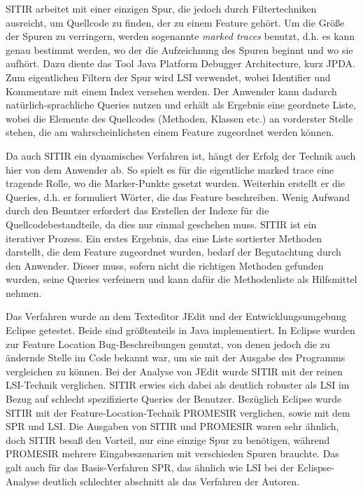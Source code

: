 \documentclass[runningheads,a4paper]{llncs}
\begin{document}
\ac{SITIR} arbeitet mit einer einzigen Spur, die jedoch durch Filtertechniken ausreicht, um Quellcode zu finden, der zu einem Feature gehört. Um die Größe der Spuren zu verringern, werden sogenannte \textit{marked traces} benutzt, d.h. es kann genau bestimmt werden, wo der die Aufzeichnung des Spuren beginnt und wo sie aufhört. Dazu diente das Tool Java Platform Debugger Architecture, kurz JPDA. Zum eigentlichen Filtern der Spur wird \ac{LSI} verwendet, wobei Identifier und Kommentare mit einem Index versehen werden. Der Anwender kann dadurch natürlich-sprachliche Queries nutzen und erhält als Ergebnis eine geordnete Liste, wobei die Elemente des Quellcodes (Methoden, Klassen etc.) an vorderster Stelle stehen, die am wahrscheinlichsten einem Feature zugeordnet werden können.

Da auch \ac{SITIR} ein dynamisches Verfahren ist, hängt der Erfolg der Technik auch hier von dem Anwender ab. So spielt es für die eigentliche marked trace eine tragende Rolle, wo die Marker-Punkte gesetzt wurden. Weiterhin erstellt er die Queries, d.h. er formuliert Wörter, die das Feature beschreiben. Wenig Aufwand durch den Benutzer erfordert das Erstellen der Indexe für die Quellcodebestandteile, da dies nur einmal geschehen muss. \ac{SITIR} ist ein iterativer Prozess. Ein erstes Ergebnis, das eine Liste sortierter Methoden darstellt, die dem Feature zugeordnet wurden, bedarf der Begutachtung durch den Anwender. Dieser muss, sofern nicht die richtigen Methoden gefunden wurden, seine Queries verfeinern und kann dafür die Methodenliste als Hilfsmittel nehmen.

Das Verfahren wurde an dem Texteditor JEdit und der Entwicklungsumgebung Eclipse getestet. Beide sind größtenteils in Java implementiert. In Eclipse wurden zur Feature Location Bug-Beschreibungen genutzt, von denen jedoch die zu ändernde Stelle im Code bekannt war, um sie mit der Ausgabe des Programms vergleichen zu können. Bei der Analyse von JEdit wurde \ac{SITIR} mit der reinen \ac{LSI}-Technik verglichen. \ac{SITIR} erwies sich dabei als deutlich robuster als \ac{LSI} im Bezug auf schlecht spezifizierte Queries der Benutzer. Bezüglich Eclipse wurde \ac{SITIR} mit der Feature-Location-Technik PROMESIR verglichen, sowie mit dem \ac{SPR} und \ac{LSI}. Die Ausgaben von \ac{SITIR} und PROMESIR waren sehr ähnlich, doch \ac{SITIR} besaß den Vorteil, nur eine einzige Spur zu benötigen, während PROMESIR mehrere Eingabeszenarien mit verschieden Spuren brauchte. Das galt auch für das Basis-Verfahren \ac{SPR}, das ähnlich wie \ac{LSI} bei der Eclispse-Analyse deutlich schlechter abschnitt als das Verfahren der Autoren.
\end{document}
